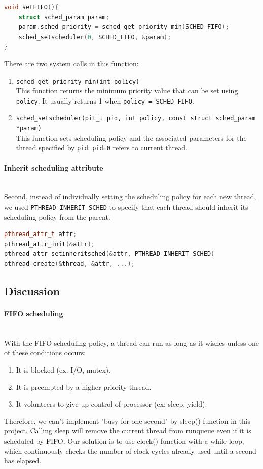 \documentclass[12pt]{article}
\begin{document}
\begin{lstlisting}[language=C++]
void setFIFO(){
	struct sched_param param;
	param.sched_priority = sched_get_priority_min(SCHED_FIFO);
	sched_setscheduler(0, SCHED_FIFO, &param);
}
\end{lstlisting}
There are two system calls in this function:
\begin{enumerate}
	\item \verb|sched_get_priority_min(int policy)|\\
		This function returns the minimum priority value that can be set using \verb|policy|. It usually returns 1 when \verb|policy = SCHED_FIFO|.
	\item \verb|sched_setscheduler(pit_t pid, int policy, const struct sched_param *param)|\\
		This function sets scheduling policy and the associated parameters for the thread specified by \verb|pid|. \verb|pid=0| refers to current thread.
\end{enumerate}
\paragraph{Inherit scheduling attribute}\mbox{}\\
Second, instead of individually setting the scheduling policy for each new thread, we used \verb|PTHREAD_INHERIT_SCHED| to specify that each thread should inherit its scheduling policy from the parent.
\begin{lstlisting}[language=C++]
pthread_attr_t attr;	
pthread_attr_init(&attr);	
pthread_attr_setinheritsched(&attr, PTHREAD_INHERIT_SCHED)
pthread_create(&thread, &attr, ...);	

\end{lstlisting}

\newpage
\subsection*{Discussion}
\paragraph{FIFO scheduling}\mbox{}\\
With the FIFO scheduling policy, a thread can run as long as it wishes unless one of these conditions occurs:
\begin{enumerate}
	\item It is blocked (ex: I/O, mutex).
	\item It is preempted by a higher priority thread.
	\item It volunteers to give up control of processor (ex: sleep, yield).
\end{enumerate}
Therefore, we can't implement "busy for one second" by sleep() function in this project. Calling sleep will remove the current thread from runqueue even if it is scheduled by FIFO. Our solution is to use clock() function with a while loop, which continuously checks the number of clock cycles already used until a second has elapsed.  
\end{document}

